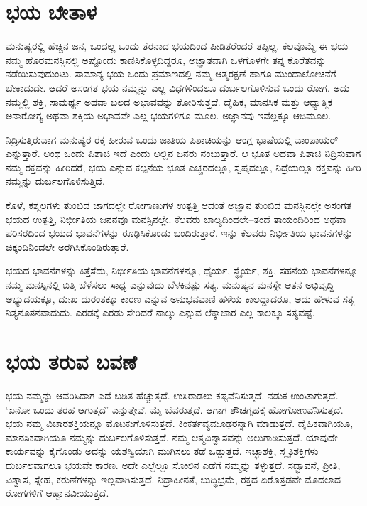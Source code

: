 \section*{ಭಯ ಬೇತಾಳ}


ಮನುಷ್ಯರಲ್ಲಿ ಹೆಚ್ಚಿನ ಜನ, ಒಂದಲ್ಲ ಒಂದು ತೆರನಾದ ಭಯದಿಂದ ಪೀಡಿತರೆಂದರೆ ತಪ್ಪಿಲ್ಲ. ಕೆಲವೊಮ್ಮೆ ಈ ಭಯ ನಮ್ಮ ಹೊರಮನಸ್ಸಿನಲ್ಲಿ ಅಷ್ಟೊಂದು ಕಾಣಿಸಿಕೊಳ್ಳದಿದ್ದರೂ, ಅಜ್ಞಾತವಾಗಿ ಒಳಗೊಳಗೇ ತನ್ನ ಕೊರೆತವನ್ನು ನಡೆಯಿಸುವುದುಂಟು. ಸಾಮಾನ್ಯ ಭಯ ಒಂದು ಪ್ರಮಾಣದಲ್ಲಿ ನಮ್ಮ ಆತ್ಮರಕ್ಷಣೆ ಹಾಗೂ ಮುಂದಾಲೋಚನೆಗೆ ಬೇಕಾದುದೇ. ಆದರೆ ಅಸಂಗತ ಭಯ ನಮ್ಮನ್ನು ಎಲ್ಲ ವಿಧಗಳಿಂದಲೂ ದುರ್ಬಲಗೊಳಿಸುವ ಒಂದು ರೋಗ. ಅದು ನಮ್ಮಲ್ಲಿ ಶಕ್ತಿ, ಸಾಮರ್ಥ್ಯ ಅಥವಾ ಬಲದ ಅಭಾವವನ್ನು ತೋರಿಸುತ್ತದೆ. ದೈಹಿಕ, ಮಾನಸಿಕ ಮತ್ತು ಆಧ್ಯಾತ್ಮಿಕ ಅನಾರೋಗ್ಯ ಅಥವಾ ಶಕ್ತಿಯ ಅಭಾವವೇ ಎಲ್ಲ ಭಯಗಳಿಗೂ ಮೂಲ. ಅಜ್ಞಾನವು ಇವೆಲ್ಲಕ್ಕೂ ಆದಿಮೂಲ.

ನಿದ್ರಿಸುತ್ತಿರುವಾಗ ಮನುಷ್ಯರ ರಕ್ತ ಹೀರುವ ಒಂದು ಜಾತಿಯ ಪಿಶಾಚಿಯನ್ನು ಆಂಗ್ಲ ಭಾಷೆಯಲ್ಲಿ ವಾಂಪಾಯರ್ ಎನ್ನುತ್ತಾರೆ. ಅಂಥ ಒಂದು ಪಿಶಾಚಿ ಇದೆ ಎಂದು ಅಲ್ಲಿನ ಜನರು ನಂಬುತ್ತಾರೆ. ಆ ಭೂತ ಅಥವಾ ಪಿಶಾಚಿ ನಿದ್ರಿಸುವಾಗ ನಮ್ಮ ರಕ್ತವನ್ನು ಹೀರಿದರೆ, ಭಯ ಎನ್ನುವ ಕಲ್ಪನೆಯ ಭೂತ ಎಚ್ಚರದಲ್ಲೂ, ಸ್ವಪ್ನದಲ್ಲೂ, ನಿದ್ರೆಯಲ್ಲೂ ರಕ್ತವನ್ನು ಹೀರಿ ನಮ್ಮನ್ನು ದುರ್ಬಲಗೊಳಿಸುತ್ತಿದೆ.

ಕೊಳೆ, ಕಶ್ಮಲಗಳು ತುಂಬಿದ ಜಾಗದಲ್ಲೇ ರೋಗಾಣುಗಳ ಉತ್ಪತ್ತಿ ಆದಂತೆ ಅಜ್ಞಾನ ತುಂಬಿದ ಮನಸ್ಸಿನಲ್ಲೇ ಅಸಂಗತ ಭಯದ ಉತ್ಪತ್ತಿ, ನಿರ್ಭೀತಿಯ ಜನನವೂ ಮನಸ್ಸಿನಲ್ಲೇ. ಕೆಲವರು ಬಾಲ್ಯದಿಂದಲೇ–ತಂದೆ ತಾಯಂದಿರಿಂದ ಅಥವಾ ಪರಿಸರದಿಂದ ಭಯದ ಭಾವನೆಗಳನ್ನು ರೂಢಿಸಿಕೊಂಡು ಬಂದಿರುತ್ತಾರೆ. ಇನ್ನು ಕೆಲವರು ನಿರ್ಭೀತಿಯ ಭಾವನೆಗಳನ್ನು ಚಿಕ್ಕಂದಿನಿಂದಲೇ ಅರಗಿಸಿಕೊಂಡಿರುತ್ತಾರೆ.

\vskip 2pt

ಭಯದ ಭಾವನೆಗಳನ್ನು ಕಿತ್ತೆಸೆದು, ನಿರ್ಭೀತಿಯ ಭಾವನೆಗಳನ್ನೂ, ಧೈರ್ಯ, ಸ್ಥೈರ್ಯ, ಶಕ್ತಿ, ಸಹನೆಯ ಭಾವನೆಗಳನ್ನೂ ನಮ್ಮ ಮನಸ್ಸಿನಲ್ಲಿ ಬಿತ್ತಿ ಬೆಳೆಸಲು ಸಾಧ್ಯ ಎನ್ನುವುದು ಬೆಳಕಿನಷ್ಟು ಸತ್ಯ. ಮನುಷ್ಯನ ಮನಸ್ಸೇ ಆತನ ಅಭಿವೃದ್ಧಿ ಅಭ್ಯುದಯಕ್ಕೂ, ದುಃಖ ದುರಂತಕ್ಕೂ ಕಾರಣ ಎನ್ನುವ ಅನುಭವವಾಣಿ ಹಳೆಯ ಕಾಲದ್ದಾದರೂ, ಅದು ಹೇಳುವ ಸತ್ಯ ನಿತ್ಯನೂತನವಾದುದು. ಎರಡಕ್ಕೆ ಎರಡು ಸೇರಿದರೆ ನಾಲ್ಕು ಎನ್ನುವ ಲೆಕ್ಕಾಚಾರ ಎಲ್ಲ ಕಾಲಕ್ಕೂ ಸತ್ಯವಷ್ಟೆ.


\section*{ಭಯ ತರುವ ಬವಣೆ}


ಭಯ ನಮ್ಮನ್ನು ಆವರಿಸಿದಾಗ ಎದೆ ಬಡಿತ ಹೆಚ್ಚುತ್ತದೆ. ಉಸಿರಾಡಲು ಕಷ್ಟವೆನಿಸುತ್ತದೆ. ನಡುಕ ಉಂಟಾಗುತ್ತದೆ. ‘ಏನೋ ಒಂದು ತರಹ ಆಗುತ್ತದೆ’ ಎನ್ನುತ್ತೇವೆ. ಮೈ ಬೆವರುತ್ತದೆ. ಆಗಾಗ ಶೌಚಗೃಹಕ್ಕೆ ಹೋಗೋಣವೆನಿಸುತ್ತದೆ. ಭಯ ನಮ್ಮ ವಿಚಾರಶಕ್ತಿಯನ್ನೂ ಮೊಟಕುಗೊಳಿಸುತ್ತದೆ. ಕಿಂಕರ್ತವ್ಯಮೂಢರನ್ನಾಗಿ ಮಾಡುತ್ತದೆ. ದೈಹಿಕವಾಗಿಯೂ, ಮಾನಸಿಕವಾಗಿಯೂ ನಮ್ಮನ್ನು ದುರ್ಬಲಗೊಳಿಸುತ್ತದೆ. ನಮ್ಮ ಆತ್ಮವಿಶ್ವಾಸವನ್ನು ಅಲುಗಾಡಿಸುತ್ತದೆ. ಯಾವುದೇ ಕಾರ್ಯವನ್ನು ಕೈಗೊಂಡು ಅದನ್ನು ಯಶಸ್ವಿಯಾಗಿ ಮುಗಿಸಲು ತಡೆ ಒಡ್ಡುತ್ತದೆ. ಇಚ್ಛಾಶಕ್ತಿ, ಸ್ಮೃತಿಶಕ್ತಿಗಳು ದುರ್ಬಲವಾಗಲೂ ಭಯವೇ ಕಾರಣ. ಅದೇ ಎಲ್ಲೆಲ್ಲೂ ಸೋಲಿನ ಎಡೆಗೆ ನಮ್ಮನ್ನು ತಳ್ಳುತ್ತದೆ. ಸದ್ಭಾವನೆ, ಪ್ರೀತಿ, ವಿಶ್ವಾಸ, ಸ್ನೇಹ, ಕರುಣೆಗಳನ್ನು ಇಲ್ಲವಾಗಿಸುತ್ತದೆ. ನಿದ್ರಾಹೀನತೆ, ಬುದ್ಧಿಭ್ರಮೆ, ರಕ್ತದ ಏರೊತ್ತಡವೇ ಮೊದಲಾದ ರೋಗಗಳಿಗೆ ಆಹ್ವಾನವೀಯುತ್ತದೆ.

